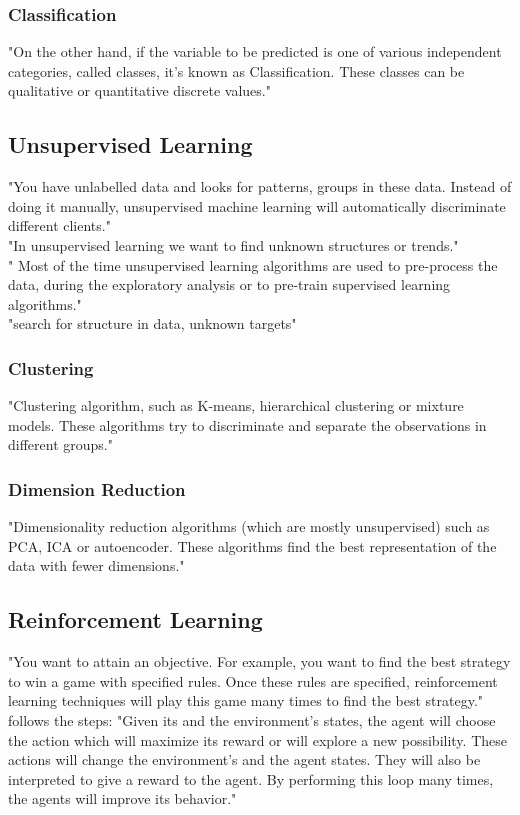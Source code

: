 \documentclass[MGS,Master,english]{twbook}%
\begin{document}
\subsubsection{Classification}
"On the other hand, if the variable to be predicted is one of various independent categories, called classes, it’s known as Classification. These classes can be qualitative or quantitative discrete values." \cite{ml:1}

\subsection{Unsupervised Learning}
"You have unlabelled data and looks for patterns, groups in these data. Instead of doing it manually, unsupervised machine learning will automatically discriminate different clients." \cite{ml:1}\\
"In unsupervised learning we want to find unknown structures or trends." \cite{ml:2}\\
" Most of the time unsupervised learning algorithms are used to pre-process the data, during the exploratory analysis or to pre-train supervised learning algorithms." \cite{ml:1}\\
"search for structure in data, unknown targets" \cite{ml:2}
\subsubsection{Clustering}
"Clustering algorithm, such as K-means, hierarchical clustering or mixture models. These algorithms try to discriminate and separate the observations in different groups." \cite{ml:1}
\subsubsection{Dimension Reduction}
"Dimensionality reduction algorithms (which are mostly unsupervised) such as PCA, ICA or autoencoder. These algorithms find the best representation of the data with fewer dimensions." \cite{ml:1}

\subsection{Reinforcement Learning}
"You want to attain an objective. For example, you want to find the best strategy to win a game with specified rules. Once these rules are specified, reinforcement learning techniques will play this game many times to find the best strategy." \cite{ml:1}\\
follows the steps: "Given its and the environment’s states, the agent will choose the action which will maximize its reward or will explore a new possibility. These actions will change the environment’s and the agent states. They will also be interpreted to give a reward to the agent. By performing this loop many times, the agents will improve its behavior." \cite{ml:1}
\end{document}
